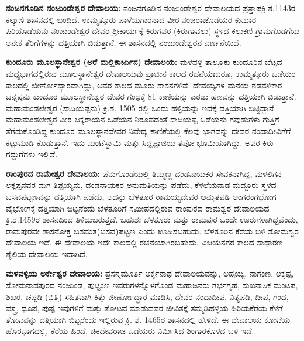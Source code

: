 \textbf{ನಂಜನಗೂಡಿನ ನಂಜುಂಡೇಶ್ವರ ದೇವಾಲಯ:} ನಂಜನಗೂಡಿನ ನಂಜುಂಡೇಶ್ವರ ದೇವಾಲಯದ ಪ್ರಸ್ತಾಪ\break ಕ್ರಿ.ಶ.1143ರ ಕಲ್ಕುಣಿ ಶಾಸನದಲ್ಲಿ ಬಂದಿದೆ. ಉಮ್ಮತ್ತೂರು ಪಾಳೆಯಗಾರನಾದ ವೀರ ನಂಜರಾಜೊಡೆಯರ ಕುಮಾರ ಪಿರಿಯೊಡೆಯನು ನಂಜುಂಡೇಶ್ವರ ದೇವರ ಶ‍್ರೀಕಾರ್ಯಕ್ಕೆ ಕಿರುಗವರ (ಕಿರುಗಾವಲು) ಸ್ಥಳದ ಕಲುಕಣಿ ಗ್ರಾಮಗೊಡಗೆಯ ಅನೇಕ ತೆರಿಗೆಗಳನ್ನು ದತ್ತಿಯಾಗಿ ಬಿಡುತ್ತಾನೆ. ಈ ಶಾಸನದಲ್ಲಿ ನಂಜುಂಡೇಶ್ವರನ ವರ್ಣನೆಯಿದೆ.

\textbf{ಕುಂದೂರು ಮೂಲಸ್ಥಾನೇಶ್ವರ (ಅರೆ ಮಲ್ಲಿಕಾರ್ಜುನ) ದೇವಾಲಯ:} ಮಳವಳ್ಳಿ ತಾಲ್ಲೂಕು ಕುಂದೂರಿನ ಬೆಟ್ಟದ ಮಧ್ಯಭಾಗದಲ್ಲಿರುವ ಮೂಲಸ್ಥಾನೇಶ್ವರ ದೇವಾಲಯವು ಪ್ರಾಚೀನ ಕಾಲದ ರಚನೆಯಾದರೂ, ಉಮ್ಮತ್ತೂರು ಒಡೆಯರ ಕಾಲದಲ್ಲಿ ಜೀರ್ಣೋದ್ಧಾರವಾಗಿದ್ದು, ಅವರ ಕಾಲದ ಮೂರು ಶಾಸನಗಳಿವೆ. ದೇವಯ್ಯಗಳ ಮನೆಯ ನಡವಳಿಕಾರ ಚನ್ನಪ್ಪನು ಕುಂದೂರ ಮೂಲಸ್ಥಾನೇಶ್ವರ ದೇವರ ಗಂಧಕ್ಕೆ 81 ಕಾಣಿಯನ್ನು ಎರಡು ಹಣವನ್ನು ದತ್ತಿಯಾಗಿ ಬಿಡುತ್ತಾನೆ. ಮಹಾಮಂಡಲೇಶ್ವರ (ಸಾದಿಯಪ್ಪನು) ಕ್ರಿ.ಶ. 1505 ರಲ್ಲಿ ಒಂದು ಹಳ್ಳಿಯನ್ನು ಇದಕ್ಕೆ ದತ್ತಿಯಾಗಿ ಬಿಟ್ಟಿದ್ದಾನೆ. ಮಹಾಮಂಡಲೇಶ್ವರ ವೀರ ಚಿಕ್ಕರಾಯನ ಒಡೆಯನ ನಿರೂಪದಂತೆ ಸಾದಿಯಪ್ಪ ಒಡೆಯನು ಗವುಡುಗಳು ಗುತ್ತಿಗೆ ತೆಗೆದು\-ಕೊಂಡಿದ್ದ ಕುಂದೂರ ಮೂಲಸ್ಥಾನದೇವರ ನಿವೇದ್ಯ ಕಾಣಿಕೆಯಲ್ಲಿ ಕೆಲವು ಭಾಗವನ್ನು ದೇವರ ನಂದಾದೀವಿಗೆಗೆ ಕಟ್ಟುಮಾಡಿ ಕೊಡುತ್ತಾನೆ. ಇದು ಮಂಟೆಸ್ವಾಮಿ ಮತ್ತು ಸಿದ್ದಪ್ಪಾಜಿಯ ತಪೋ ಭೂಮಿಯಾಗಿದ್ದು. ಅವರ ಕಿರು ಗದ್ದುಗೆಗಳು ಇಲ್ಲಿವೆ.

\textbf{ರಾಂಪುರದ ರಾಮೇಶ್ವರ ದೇವಾಲಯ:} ಪೆನುಗೊಂಡೆಯಲ್ಲಿ ತಿಮ್ಮಣ್ಣ ದಂಡನಾಯಕರ ಸೇವಕನಾಗಿದ್ದ, ಮಳಲಿಗನ ಲಕ್ಕಪ್ಪನವರ ಮಗ ತಿಪ್ಪಯ್ಯನು, ದಂಡನಾಯಕರ ಅನುಮತಿಯನ್ನು ಪಡೆದು, ಕೆಳಲೆಯನಾಡ ಮದ್ದೂರು ಸ್ಥಳದ ಬಸವಪಟ್ಟಣ\-ವನ್ನು ದತ್ತಿಯಾಗಿ ಪಡೆದು, ಅದನ್ನು ಬೆಳತೂರ ರಾಮಯ್ಯದೇವರ ಅಮೃತಪಡಿ ಅಂಗರಂಗಭೋಗ ವೈಭೋಗಕ್ಕೆ ದತ್ತಿಯಾಗಿ ಬಿಟ್ಟನೆಂದು ಬೆಳತೂರಿಗೆ ಸಮೀಪದಲ್ಲಿರುವ ರಾಂಪುರದ ರಾಮೆಶ್ವರ ದೇವಾಲಯದ ಕ್ರಿ.ಶ.1459ರ ಶಾಸನದಿಂದ ತಿಳಿದು\-ಬರುತ್ತದೆ. ಬಹುಶಃ ಬೆಳತೂರು ಮತ್ತು ರಾಮಪುರ ಒಂದೇ ಊರುಗಳಾಗಿದ್ದವೆಂದು, ರಾಮಪುರವೇ ಶಾಸನೋಕ್ತ ಬಸವಂತ(ಬಸವ)ಪಟ್ಟಣ ಎಂದು ಊಹಿಸಬಹುದು. ಬೆಳತೂರಿನ ಕೆರೆಯ ಬಳಿ ಸೋಮೆಶ್ವರ ದೇವಾಲಯ ಇದೆ. ಈ ದೇವಾಲಯ ಇದೇ ಕಾಲದಲ್ಲಿ ರಚನೆಯಾಗಿರಬಹುದು. ವಿಜಯನಗರ ಕಾಲದ ಸಾಧಾರಣ ಶೈಲಿಯ ದೇವಾಲಯ ಇದಾಗಿದೆ.

\textbf{ಮಳವಳ್ಳಿಯ ಅರ್ಕೇಶ್ವರ ದೇವಾಲಯ:} ಪ್ರಸನ್ನಮೂರ್ತಿ ಅರ್ಕ್ಕನಾಥ ದೇವಾಲಯವನ್ನು, ಅಪ್ಪಯ್ಯ, ನಾಗಂಣ, ಲಕ್ಕಪ್ಪ, ಸೋಮನಾಥಪುರದ ನಂಜುಂಡ, ಪುಟ್ಟಂಣ ಇವರುಗಳನ್ನೊಳಗೊಂಡ ಮಹಾಜನರು ಗರ್ಭಗೃಹ, ಸುಖನಾಸಿಕ ಮಂಟಪ, ಶಿಖರ, ಚಪ್ಪಡಿ (ಭಿತ್ತಿ) ಸಹಿತವಾಗಿ ಕಿತ್ತು ಜೀರ್ಣೋದ್ಧಾರ ಮಾಡಿಸಿ, ದೇವರ ನಂದಾದೀಪ, ನಿತ್ಯಪಡಿ, ದೀಪ, ಗಂಧ, ವಸ್ತ್ರ, ಧೂಪ, ಪುಷ್ಪ ಇವುಗಳಿಗೆ ಮತ್ತು ತೋಟವ ಮಾಡುವವರ ಜೀವಿತಕ್ಕೆ ತಮ್ಮಡಿಹಳ್ಳಿಯ ಹಿರಿಯಕೆರೆಯ ಕೆಳಗೆ ತೋಟವನ್ನು ದತ್ತಿಯಾಗಿ ಬಿಟ್ಟರೆಂದು ಇಲ್ಲಿರುವ ಕ್ರಿ. ಶ. 1465ರ ಶಾಸನದಲ್ಲಿ ಹೇಳಿದೆ. ಈ ದೇವಾಲಯ ಕೋಟೆಯ ಹೊರಭಾಗದಲ್ಲಿ, ಕೆರೆಯ ಹಿಂದೆ, ಚಿಕದೇವರಾಜ ಒಡೆಯರು ನಿರ್ಮಿಸಿದ ಶಿಂಗಾರಕೊಳದ ಬಳಿ ಇದೆ.

